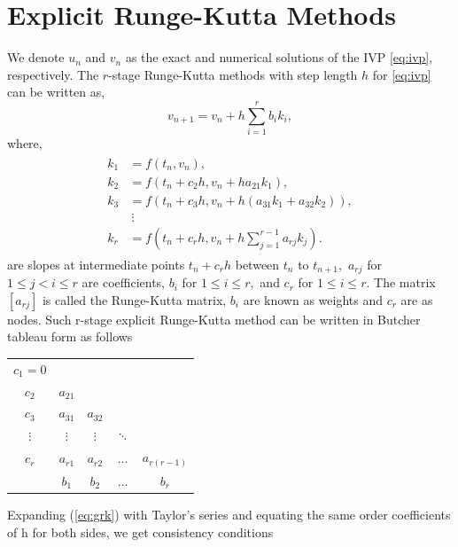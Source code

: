 \documentclass[a4paper, preprint,11pt]{elsarticle}
\numberwithin{equation}{section}
\begin{document}
\section{Explicit Runge-Kutta Methods}
We denote $u_n$ and $v_n$ as the exact and numerical solutions of the IVP \eqref{eq:ivp}, respectively. The $r$-stage Runge-Kutta methods \cite{book1,iserles2009first} with step length $h$ for \eqref{eq:ivp} can be written as,
\begin{equation}    \label{eq:grk}
v_{n+1} = v_n + h \sum_{i=1}^{r} b_i k_i,
\end{equation} where,
\begin{eqnarray*}
\begin{aligned}
k_1 &= f(t_n, v_n), \\
k_2 &= f(t_n + c_2 h, v_n + h a_{21} k_1), \\
k_3 &= f(t_n + c_3 h, v_n + h (a_{31} k_1 + a_{32} k_2)), \\
&\ \vdots \\
k_r &= f\left(t_n + c_r h, v_n + h \sum_{j=1}^{r-1} a_{rj} k_j\right).
\end{aligned}
\end{eqnarray*}
are slopes at intermediate points $t_n+c_rh$ between $t_n$ to $t_{n+1},$  $a_{rj}$ for $ 1 \leq j <i \leq r$ are coefficients, $b_i$ for $1 \leq i \leq r,$ and $c_r$ for $1 \leq i \leq r.$ The matrix $[a_{rj}]$ is called the Runge-Kutta matrix, $b_i$ are known as weights and $c_r$ are as nodes. Such r-stage explicit Runge-Kutta method can be written in Butcher tableau form \cite{butcher2016numerical} as follows
\begin{table}[h]
    \centering
    \renewcommand{\arraystretch}{1.5}
    \begin{tabular}{c|cccc}
        $c_1=0$  &      &        &        &        \\
        $c_2$   & $a_{21}$  &       &        &        \\
        $c_3$   & $a_{31}$  & $a_{32}$  &       &        \\
        $\vdots$  & $\vdots$  & $\vdots$  & $\ddots$  &        \\
        $c_r$   & $a_{r1}$  & $a_{r2}$  & $\dots$  &  $a_{r(r-1)}$    \\
        \hline
               & $b_1$   & $b_2$   & $\dots$   & $b_r$   
    \end{tabular}
\end{table}
\newline Expanding (\ref{eq:grk}) with Taylor's series and equating the same order coefficients of h for both sides, we get consistency conditions 
\end{document}
